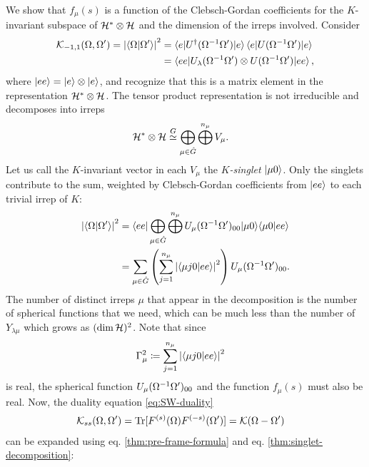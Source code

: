 We show that $f_{\mu}(s)$ is a function of the Clebsch-Gordan coefficients for the $K$-invariant subspace of $\mathcal{H}^* \otimes \mathcal{H}$ and the dimension of the irreps involved.
Consider
\begin{align}\label{coherent-state-inner-product}
\rker{-1,1}(\Omega,\Omega') =\left| \braket{\Omega | \Omega'} \right|^2
	&= \braket{e| \rep\dgg (\Omega^{-1} \Omega') |e}
	\braket{e| \rep (\Omega^{-1} \Omega') |e} \nonumber \\
	&=  \braket{ee| \rep_{\lambda} (\Omega^{-1} \Omega') \otimes \rep(\Omega^{-1} \Omega') |ee},
\end{align}
where ${\left\vert{ee}\right\rangle} = {\left\vert{e}\right\rangle} \otimes {\left\vert{e}\right\rangle}$, and recognize that this is a matrix element in the representation $\mathcal{H}^* \otimes \mathcal{H}$. The tensor product representation is not irreducible and decomposes into irreps
\begin{align}
\mathcal{H}^* \otimes \mathcal{H} &\stackrel{G}{\simeq} \bigoplus_{\mu \in \hat{G}} \bigoplus^{n_{\mu}} V_{\mu}.
\end{align}
Let us call the $K$-invariant vector in each $V_{\mu}$ the \emph{$K$-singlet} ${\left\vert{\mu 0}\right\rangle}$. Only the singlets contribute to the sum, weighted by Clebsch-Gordan coefficients from ${\left\vert{ee}\right\rangle}$ to each trivial irrep of $K$:
\begin{align}
\left| \braket{\Omega | \Omega'} \right|^2
&=  \braket{
	ee| \bigoplus_{\mu \in \hat{G}} \bigoplus^{n_{\mu}} \rep_{\mu} (\Omega^{-1} \Omega')_{00} \ketbra{\mu 0}{\mu 0} ee} \nonumber \\
&= \sum_{\mu \in \hat{G}} \left( \sum_{j=1}^{n_{\mu}}
\left| \braket{\mu j 0|ee} \right|^2 \right)
\rep_{\mu} (\Omega^{-1} \Omega')_{00}. \label{thm:singlet-decomposition}
\end{align}
The number of distinct irreps $\mu$ that appear in the decomposition is the number of spherical functions that we need, which can be much less than the number of $Y_{\lambda \mu}$ which grows as $(\dim\mathcal{H})^2$. Note that since 
\begin{align}
	\Gamma_{\mu}^2 &\coloneqq \sum_{j=1}^{n_{\mu}} \left| \braket{\mu j 0|ee} \right|^2
\end{align}
is real, the spherical function $U_{\mu} (\Omega^{-1} \Omega')_{00}$ and the function $f_{\mu}(s)$ must also be real. Now, the duality equation \eqref{eq:SW-duality}
\begin{align}
	\mathcal{K}_{ss}(\Omega,\Omega') &= \mathrm{Tr} [F^{(s)} (\Omega)F^{(-s)}(\Omega')] =  \mathcal{K}(\Omega - \Omega')
\end{align}
can be expanded using eq. \eqref{thm:pre-frame-formula} and eq. \eqref{thm:singlet-decomposition}:
